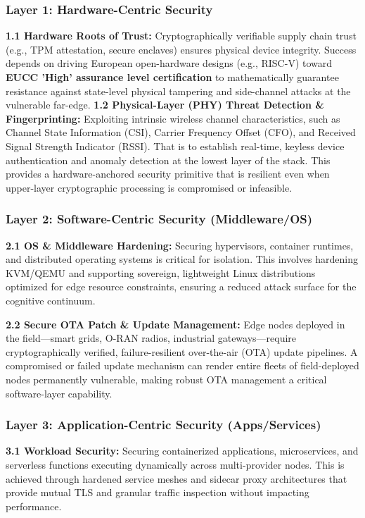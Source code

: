 \documentclass{ieeeaccess}
\begin{document}
\subsubsection*{Layer 1: Hardware-Centric Security}
\textbf{1.1 Hardware Roots of Trust:} Cryptographically verifiable supply chain trust (e.g., TPM attestation, secure enclaves) ensures physical device integrity. Success depends on driving European open-hardware designs (e.g., RISC-V) toward \textbf{EUCC 'High' assurance level certification} \cite{eucc} to mathematically guarantee resistance against state-level physical tampering and side-channel attacks at the vulnerable far-edge.
\textbf{1.2 Physical-Layer (PHY) Threat Detection \& Fingerprinting:} Exploiting intrinsic wireless channel characteristics, such as Channel State Information (CSI), Carrier Frequency Offset (CFO), and Received Signal Strength Indicator (RSSI). That is to establish real-time, keyless device authentication and anomaly detection at the lowest layer of the stack. This provides a hardware-anchored security primitive that is resilient even when upper-layer cryptographic processing is compromised or infeasible.

\subsubsection*{Layer 2: Software-Centric Security (Middleware/OS)}

\textbf{2.1 OS \& Middleware Hardening:} Securing hypervisors, container runtimes, and distributed operating systems is critical for isolation. This involves hardening KVM/QEMU and supporting sovereign, lightweight Linux distributions optimized for edge resource constraints, ensuring a reduced attack surface for the cognitive continuum.

\textbf{2.2 Secure OTA Patch \& Update Management:} Edge nodes deployed in the field---smart grids, O-RAN radios, industrial gateways---require cryptographically verified, failure-resilient over-the-air (OTA) update pipelines. A compromised or failed update mechanism can render entire fleets of field-deployed nodes permanently vulnerable, making robust OTA management a critical software-layer capability.

\subsubsection*{Layer 3: Application-Centric Security (Apps/Services)}

\textbf{3.1 Workload Security:} Securing containerized applications, microservices, and serverless functions executing dynamically across multi-provider nodes. This is achieved through hardened service meshes and sidecar proxy architectures that provide mutual TLS and granular traffic inspection without impacting performance.
\end{document}
